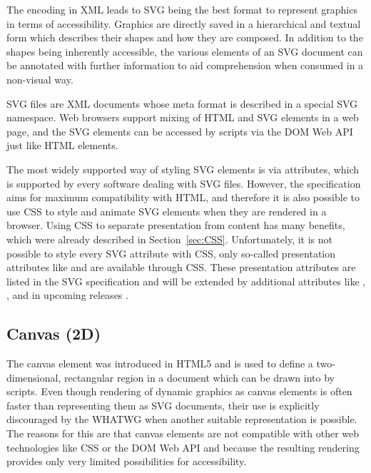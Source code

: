 The encoding in XML leads to SVG being the best format to represent
graphics in terms of accessibility. Graphics are directly saved in a
hierarchical and textual form which describes their shapes and how
they are composed. In addition to the shapes being inherently
accessible, the various elements of an SVG document can be annotated
with further information to aid comprehension when consumed in a
non-visual way.

SVG files are XML documents whose meta format is described in a
special SVG namespace. Web browsers support mixing of HTML and SVG
elements in a web page, and the SVG elements can be accessed by
scripts via the DOM Web API just like HTML elements.

The most widely supported way of styling SVG elements is via
attributes, which is supported by every software dealing with SVG
files. However, the specification aims for maximum compatibility with
HTML, and therefore it is also possible to use CSS to style and
animate SVG elements when they are rendered in a browser. Using CSS to
separate presentation from content has many benefits, which were
already described in Section~\ref{sec:CSS}. Unfortunately, it is not
possible to style every SVG attribute with CSS, only so-called
presentation attributes like  and 
are available through CSS. These presentation attributes are listed in
the SVG specification \parencite{SVG11} and will be extended by
additional attributes like , , 
and  in upcoming releases \parencite{SVG2}.





\subsection{Canvas (2D)}
\label{sec:Canvas2D}


The canvas element was introduced in HTML5 \parencite{HTML} and is
used to define a two-dimensional, rectangular region in a document
which can be drawn into by scripts. Even though rendering of dynamic
graphics as canvas elements is often faster than representing them as
SVG documents, their use is explicitly discouraged by the WHATWG when
another suitable representation is possible. The reasons for this are
that canvas elements are not compatible with other web technologies
like CSS or the DOM Web API and because the resulting rendering
provides only very limited possibilities for accessibility.

